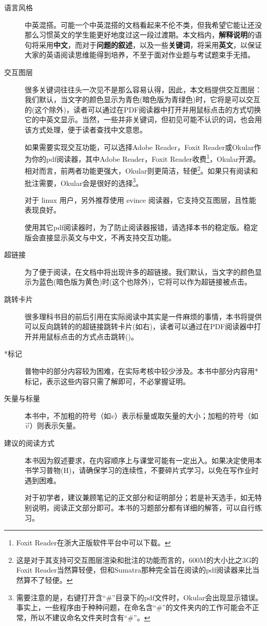 \begin{description}
    \item[语言风格]中英混搭。可能一个中英混搭的文档看起来不伦不类，但我希望它能让还没那么习惯英文的学生能更好地度过这一段过渡期。本文档内，\textbf{解释说明}的语句将采用\textbf{中文}，而对于\textbf{问题的叙述}，以及一些\textbf{关键词}，将采用\textbf{英文}，以保证大家的英语阅读思维能得到培养，不至于面对作业题与考试题束手无措。
    \item[交互图层] 很多关键词往往头一次见不是那么容易认得，因此，本文档提供交互图层：我们默认，当文字的颜色显示为{\color{plaincyan}青色(暗色版为青绿色)}时，它将是可以交互的(这个除外)，读者可以通过在PDF阅读器中打开并用鼠标点击的方式切换它的中英文显示。当然，一些并非关键词，但初见可能不认识的词，也会用该方式处理，便于读者查找中文意思。

          如果需要实现交互功能，可以选择Adobe Reader，Foxit Reader或Okular作为你的pdf阅读器，其中Adobe Reader，Foxit Reader收费\footnote{Foxit Reader在浙大正版软件平台中可以下载。}，Okular开源。相对而言，前两者功能更强大，Okular则更简洁，轻便\footnote{这是对于其支持可交互图层渲染和批注的功能而言的，600M的大小比之3G的Foxit Reader当然算轻便，但和Sumatra那种完全旨在阅读的pdf阅读器来比当然算不了轻便。}。如果只有阅读和批注需要，Okular会是很好的选择\footnote{需要注意的是，右键打开含``\#''目录下的pdf文件时，Okular会出现显示错误。事实上，一些程序由于种种问题，在命名含``\#''的文件夹内的工作可能会不正常，所以不建议命名文件夹时含有``\#''。}。

          对于 linux 用户，另外推荐使用 evince 阅读器，它支持交互图层，且性能表现良好。

          使用其它pdf阅读器时，为了防止阅读器报错，请选择本书的稳定版。稳定版会直接显示英文与中文，不再支持交互功能。

    \item[超链接]为了便于阅读，在文档中将出现许多的超链接。我们默认，当文字的颜色显示为{\color{thisblue}蓝色(暗色版为黄色)}时(这个也除外)，它将可以作为超链接被点击。
    \item[跳转卡片]很多理科书目的前后引用在实际阅读中其实是一件麻烦的事情，本书将提供可以反向跳转的的超链接跳转卡片(如右)，读者可以通过在PDF阅读器中打开并用鼠标点击的方式点击跳转()。
    \item[*标记]普物中的部分内容较为困难，在实际考核中较少涉及。本书中部分内容用*标记，表示这些内容只需了解即可，不必掌握证明。
    \item [矢量与标量]本书中，不加粗的符号（如$v$）表示标量或取矢量的大小；加粗的符号（如$\vec{v}$）则表示矢量。
    \item [建议的阅读方式] 本书因为叙述要求，在内容顺序上与课堂可能有一定出入。如果决定使用本书学习普物(H)，请确保学习的连续性，不要碎片式学习，以免在写作业时遇到困难。

          对于初学者，建议兼顾笔记的正文部分和证明部分；若是补天选手，如无特别说明，阅读正文部分即可。本书的习题部分都有详细的解答，可以自行练习。
\end{description}
